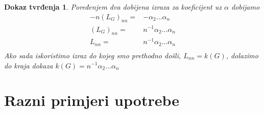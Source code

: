 \documentclass[11pt]{article}
\newtheorem*{custom_proof}{Dokaz tvrđenja}
\begin{document}
\begin{custom_proof}
		Poređenjem dva dobijena izraza za koeficijent uz $\alpha$ dobijamo 
		\[
			\begin{split} 
				-n (L_G)_{nn}  = &  - \alpha_2 \dots \alpha_n \\
				(L_G)_{nn}  = & n^{-1} \alpha_2 \dots \alpha_n \\
				 L_{nn} = & n^{-1} \alpha_2 \dots \alpha_n \\ 
			\end{split} 
		\]
		Ako sada iskoristimo izraz do kojeg smo prethodno došli, $ L_{nn} = k(G)$, dolazimo do kraja dokaza $k(G) = n^{-1} \alpha_2 \dots \alpha_n$
		
	\end{custom_proof} 

	\section{Razni primjeri upotrebe}
\end{document}
